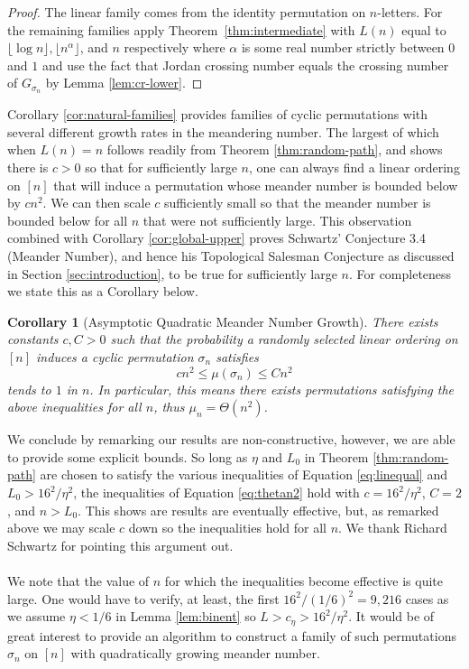 \documentclass[11pt,a4paper]{amsart}
\newtheorem{corollary}[theorem]{Corollary}
\theoremstyle{definition}
\theoremstyle{remark}
\begin{document}
\begin{proof}
The linear family comes from the identity permutation on $n$-letters.  For the remaining families apply Theorem~\ref{thm:intermediate} with $L(n)$ equal to $\lfloor \log n\rfloor, \lfloor n^\alpha\rfloor$, and $n$ respectively where $\alpha$ is some real number strictly between $0$ and $1$ and use the fact that Jordan crossing number equals the crossing number of $G_{\sigma_{n}}$ by Lemma \ref{lem:cr-lower}.  
\end{proof}


Corollary \ref{cor:natural-families} provides families of cyclic permutations with several different growth rates in the meandering number.  The largest of which when $L(n) = n$ follows readily from Theorem \ref{thm:random-path}, and shows there is $c > 0$ so that for sufficiently large $n$, one can always find a linear ordering on $[n]$ that will induce a permutation whose meander number is bounded below by $cn^{2}$.  We can then scale $c$ sufficiently small so that the meander number is bounded below for all $n$ that were not sufficiently large.  This observation combined with Corollary \ref{cor:global-upper} proves Schwartz' Conjecture 3.4 (Meander Number), and hence his Topological Salesman Conjecture as discussed in Section \ref{sec:introduction}, to be true for sufficiently large $n$.  For completeness we state this as a Corollary below.  
\begin{corollary}[Asymptotic Quadratic Meander Number Growth]\label{cor:random-global}
There exists constants $c, C > 0$ such that the probability a randomly selected linear ordering on $[n]$ induces a cyclic permutation $\sigma_{n}$ satisfies 
\begin{equation}\label{eq:thetan2}
        cn^{2} \leq \mu(\sigma_{n}) \leq Cn^{2}
\end{equation}
tends to $1$ in $n$.  In particular, this means there exists permutations satisfying the above inequalities for all $n$, thus $\mu_{n} = \Theta(n^{2})$.    
\end{corollary}
We conclude by remarking our results are non-constructive, however, we are able to provide some explicit bounds.  So long as $\eta$ and $L_{0}$ in Theorem \ref{thm:random-path} are chosen to satisfy the various inequalities of Equation \ref{eq:linequal} and $L_{0} > 16^{2}/\eta^{2}$, the inequalities of Equation \ref{eq:thetan2} hold with $c = 16^{2}/\eta^{2}$, $C = 2$, and $n > L_{0}$.  This shows are results are eventually effective, but, as remarked above we may scale $c$ down so the inequalities hold for all $n$.  We thank Richard Schwartz for pointing this argument out.  \\
\\
We note that the value of $n$ for which the inequalities become effective is quite large.  One would have to verify, at least, the first $16^{2}/(1/6)^{2} = 9,216$ cases as we assume $\eta < 1/6$ in Lemma \ref{lem:binent} so $L > c_{\eta} > 16^{2}/\eta^{2}$.  It would be of great interest to provide an algorithm to construct a family of such permutations $\sigma_{n}$ on $[n]$ with quadratically growing meander number.  




\end{document}
